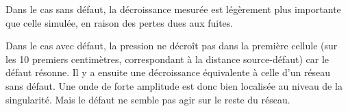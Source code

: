 Dans le cas sans défaut, la décroissance mesurée est légèrement plus importante que celle simulée, en raison des pertes dues aux fuites.

Dans le cas avec défaut, la pression ne décroît pas dans la première cellule (sur les 10 premiers centimètres, correspondant à la distance source-défaut) car le défaut résonne. Il y a ensuite une décroissance équivalente à celle d'un réseau sans défaut.
Une onde de forte amplitude est donc bien localisée au niveau de la singularité. Mais le défaut ne semble pas agir sur le reste du réseau. \\~\\





